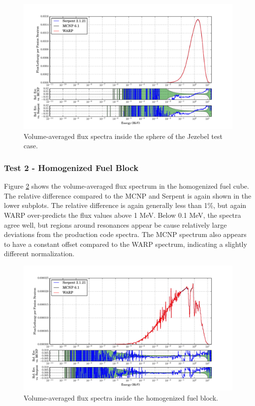 \documentclass[preprint,12pt]{elsarticle}
\begin{document}
\begin{figure}[h!]
\centering
\includegraphics[width=\textwidth,trim= 1cm 0cm 1cm 0cm]{graphics/jezebel_spec.pdf}
\caption{Volume-averaged flux spectra inside the sphere of the Jezebel test case. \label{jezebel_spec} }
\end{figure}

\newpage
\subsubsection{Test 2 - Homogenized Fuel Block}

Figure \ref{homfuel_spec} shows the volume-averaged flux spectrum in the homogenized fuel cube.  The relative difference compared to the MCNP and Serpent is again shown in the lower subplots.  The relative difference is again generally less than 1\%, but again WARP over-predicts the flux values above 1 MeV.  Below 0.1 MeV, the spectra agree well, but regions around resonances appear be cause relatively large deviations from the production code spectra.  The MCNP spectrum also appears to have a constant offset compared to the WARP spectrum, indicating a slightly different normalization. 

\begin{figure}[h!]
\centering
\includegraphics[width=\textwidth,trim= 1cm 0cm 1cm 0cm]{graphics/homfuel_spec.pdf}
\caption{Volume-averaged flux spectra inside the homogenized fuel block. \label{homfuel_spec} }
\end{figure}
\end{document}
